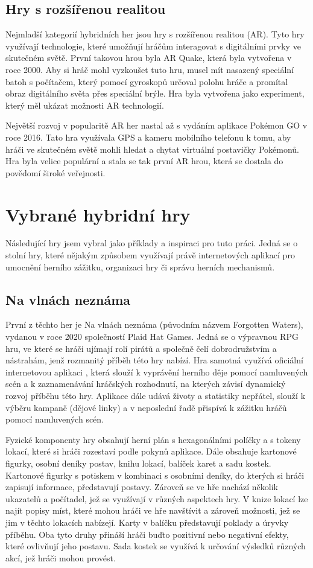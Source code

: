 \subsection{Hry s rozšířenou realitou}
Nejmladší kategorií hybridních her jsou hry s rozšířenou realitou (AR). Tyto hry využívají technologie, které umožňují hráčům interagovat s digitálními prvky ve skutečném světě. První takovou hrou byla AR Quake, která byla vytvořena v roce 2000. Aby si hráč mohl vyzkoušet tuto hru, musel mít nasazený speciální batoh s počítačem, který pomocí gyroskopů určoval polohu hráče a promítal obraz digitálního světa přes speciální brýle. Hra byla vytvořena jako experiment, který měl ukázat možnosti AR technologií. \cite{ar_history}

Největší rozvoj v popularitě AR her nastal až s vydáním aplikace Pokémon GO v roce 2016. Tato hra využívala GPS a kameru mobilního telefonu k tomu, aby hráči ve skutečném světě mohli hledat a chytat virtuální postavičky Pokémonů. Hra byla velice populární a stala se tak první AR hrou, která se dostala do povědomí široké veřejnosti.

\section{Vybrané hybridní hry}
Následující hry jsem vybral jako příklady a inspiraci pro tuto práci. Jedná se o stolní hry, které nějakým způsobem využívají právě internetových aplikací pro umocnění herního zážitku, organizaci hry či správu herních mechanismů.

\subsection{Na vlnách neznáma}
První z těchto her je Na vlnách neznáma (původním názvem Forgotten Waters), vydanou v roce 2020 společností Plaid Hat Games. Jedná se o výpravnou RPG hru, ve které se hráči ujímají rolí pirátů a společně čelí dobrodružstvím a nástrahám, jenž rozmanitý příběh této hry nabízí. Hra samotná využívá oficiální internetovou aplikaci \cite{forgotten_waters_app}, která slouží k vyprávění herního děje pomocí namluvených scén a k zaznamenávání hráčských rozhodnutí, na kterých závisí dynamický rozvoj příběhu této hry. Aplikace dále udává životy a statistiky nepřátel, slouží k výběru kampaně (dějové linky) a v neposlední řadě přispívá k zážitku hráčů pomocí namluvených scén.

Fyzické komponenty hry obsahují herní plán s hexagonálními políčky a s tokeny lokací, které si hráči rozestaví podle pokynů aplikace. Dále obsahuje kartonové figurky, osobní deníky postav, knihu lokací, balíček karet a sadu kostek. Kartonové figurky s potiskem v kombinaci s osobními deníky, do kterých si hráči zapisují informace, představují postavy. Zároveň se ve hře nachází několik ukazatelů a počítadel, jež se využívají v různých aspektech hry. V knize lokací lze najít popisy míst, které mohou hráči ve hře navštívit a zároveň možnosti, jež se jim v těchto lokacích nabízejí. Karty v balíčku představují poklady a úryvky příběhu. Oba tyto druhy přináší hráči buďto pozitivní nebo negativní efekty, které ovlivňují jeho postavu. Sada kostek se využívá k určování výsledků různých akcí, jež hráči mohou provést.

